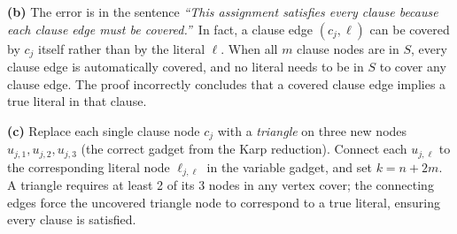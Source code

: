 \documentclass[11pt]{article}
\begin{document}
\begin{enumerate}[leftmargin=0pt, itemindent=1.7em, itemsep=1.2em]
\medskip
\noindent
\textbf{(b)} The error is in the sentence \emph{``This assignment satisfies every clause because each clause edge must be covered.''}\ In fact, a clause edge $(c_j, \ell)$ can be covered by $c_j$ itself rather than by the literal $\ell$. When all $m$ clause nodes are in $S$, every clause edge is automatically covered, and no literal needs to be in $S$ to cover any clause edge. The proof incorrectly concludes that a covered clause edge implies a true literal in that clause.

\medskip
\noindent
\textbf{(c)} Replace each single clause node $c_j$ with a \emph{triangle} on three new nodes $u_{j,1}, u_{j,2}, u_{j,3}$ (the correct gadget from the Karp reduction). Connect each $u_{j,\ell}$ to the corresponding literal node $\ell_{j,\ell}$ in the variable gadget, and set $k = n + 2m$. A triangle requires at least 2 of its 3 nodes in any vertex cover; the connecting edges force the uncovered triangle node to correspond to a true literal, ensuring every clause is satisfied.
\fi

\end{enumerate}
\end{document}
